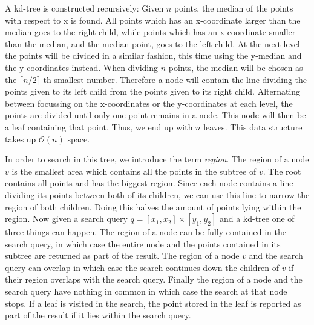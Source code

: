 A kd-tree is constructed recursively: Given $n$ points, the median of the points with respect to x is found. All points which has an x-coordinate larger than the median goes to the right child, while points which has an x-coordinate smaller than the median, and the median point, goes to the left child. At the next level the points will be divided in a similar fashion, this time using the y-median and the y-coordinates instead. When dividing $n$ points, the median will be chosen as the $\lceil n/2 \rceil$-th smallest number. Therefore a node will contain the line dividing the points given to its left child from the points given to its right child.
Alternating between focussing on the x-coordinates or the y-coordinates at each level, the points are divided until only one point remains in a node. This node will then be a leaf containing that point. Thus, we end up with $n$ leaves. This data structure takes up $\mathcal{O}(n)$ space.

In order to search in this tree, we introduce the term \emph{region}. The region of a node $v$ is the smallest area which contains all the points in the subtree of $v$. The root contains all points and has the biggest region. Since each node contains a line dividing its points between both of its children, we can use this line to narrow the region of both children. Doing this halves the amount of points lying within the region. Now given a search query $q = [x_1, x_2] \times [y_1, y_2]$ and a kd-tree one of three things can happen. The region of a node can be fully contained in the search query, in which case the entire node and the points contained in its subtree are returned as part of the result. The region of a node $v$ and the search query can overlap in which case the search continues down the children of $v$ if their region overlaps with the search query. Finally the region of a node and the search query have nothing in common in which case the search at that node stops. If a leaf is visited in the search, the point stored in the leaf is reported as part of the result if it lies within the search query. 

